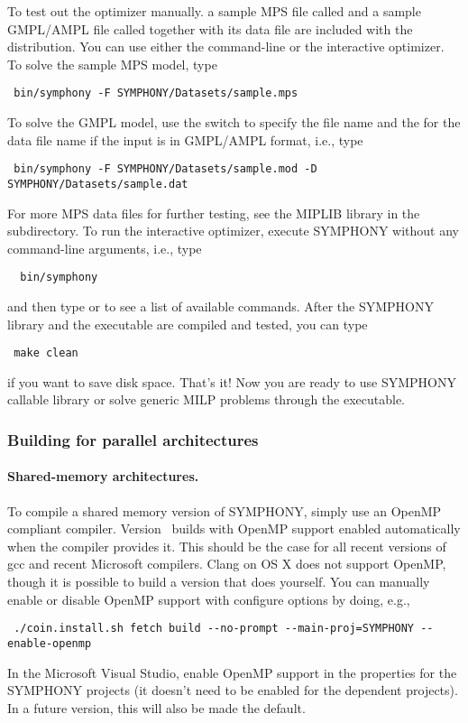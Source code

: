 To test out the optimizer manually. a
sample MPS file called  and a sample GMPL/AMPL file called
 together with its data file
 are included with the distribution. You can
use either the command-line or the interactive optimizer. To solve the sample
MPS model, type
{\color{Brown}
\begin{verbatim}
 bin/symphony -F SYMPHONY/Datasets/sample.mps
\end{verbatim}
} To solve the GMPL model, use the  switch to specify the file name
and the  for the data file name if the input is in GMPL/AMPL format,
i.e., type 
{\color{Brown}
\begin{verbatim}
 bin/symphony -F SYMPHONY/Datasets/sample.mod -D SYMPHONY/Datasets/sample.dat
\end{verbatim}}
For more MPS data files for further testing, see the MIPLIB library in the
 subdirectory. To run the interactive optimizer, execute SYMPHONY
without any command-line arguments, i.e., type
{\color{Brown}
\begin{verbatim}
  bin/symphony 
\end{verbatim}}
and then type  or  to see a list of available commands.
After the SYMPHONY library and the executable are compiled and tested, you
can type
{\color{Brown}
\begin{verbatim}
 make clean 
\end{verbatim}}
if you want to save disk space. That's it! Now you are ready to use SYMPHONY
callable library or solve generic MILP problems through the executable.

\subsubsection{Building for parallel architectures}

\paragraph{Shared-memory architectures.}

To compile a shared memory version of SYMPHONY, simply use an OpenMP compliant
compiler. Version \VER\  builds with OpenMP support enabled automatically when
the compiler provides it. This should be the case for all recent versions of
gcc and recent Microsoft compilers. Clang on OS X does not support OpenMP,
though it is possible to build a version that does yourself. You can manually
enable or disable OpenMP support with configure options by doing, e.g.,
{\color{Brown}
\begin{verbatim}
 ./coin.install.sh fetch build --no-prompt --main-proj=SYMPHONY --enable-openmp
\end{verbatim}
} 
In the Microsoft Visual Studio, enable OpenMP
support in the properties for the SYMPHONY projects (it doesn't need to be
enabled for the dependent projects). In a future version, this will also be
made the default.


